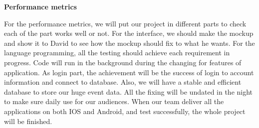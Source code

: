 \documentclass[10pt,letterpaper]{article}
\begin{document}
\begin{center}
\large
\textbf{Performance metrics}
\end{center}

For the performance metrics, we will put our project in different parts to check each of the part works well or not. For the interface, we should make the mockup and show it to David to see how the mockup should fix to what he wants. For the language programming, all the testing should achieve each requirement in progress. Code will run in the background during the changing for features of application. As login part, the achievement will be the success of login to account information and connect to database. Also, we will have a stable and efficient database to store our huge event data. All the fixing will be undated in the night to make sure daily use for our audiences. When our team deliver all the applications on both IOS and Android, and test successfully, the whole project will be finished.
\end{document}
